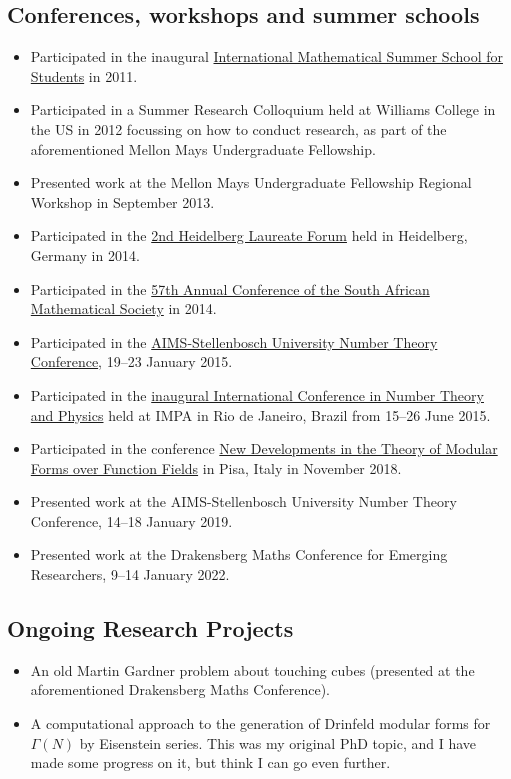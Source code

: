 \documentclass{article}
\begin{document}
\subsection{Conferences, workshops and summer schools}
\begin{itemize}
	\item Participated in the inaugural \href{http://math.jacobs-university.de/summerschool/2011}{International Mathematical Summer School for Students} in 2011.
	\item Participated in a Summer Research Colloquium held at Williams College in the US in 2012 focussing on how to conduct research, as part of the aforementioned Mellon Mays Undergraduate Fellowship.
	\item Presented work at the Mellon Mays Undergraduate Fellowship Regional Workshop in September 2013.
	\item Participated in the \href{http://www.heidelberg-laureate-forum.org/event_2014/}{2nd Heidelberg Laureate Forum} held in Heidelberg, Germany in 2014.
	\item Participated in the \href{http://www.unisa.ac.za/Default.asp?Cmd=ViewContent&ContentID=96795}{57th Annual Conference of the South African Mathematical Society} in 2014.
	\item Participated in the \href{http://www.aims.ac.za/en/research-centre/workshops-conferences/past/aims-stellenbosch-university-number-theory-conference-19-23-january-2015}{AIMS-Stellenbosch University Number Theory Conference}, 19--23 January 2015.
	\item Participated in the \href{http://www.impa.br/opencms/pt/eventos/store/evento_1504}{inaugural International Conference in Number Theory and Physics} held at IMPA in Rio de Janeiro, Brazil from 15--26 June 2015.
	\item Participated in the conference \href{https://dmvpisa2018.wordpress.com/}{New Developments in the Theory of Modular Forms over Function Fields} in Pisa, Italy in November 2018.
	\item Presented work at the AIMS-Stellenbosch University Number Theory Conference, 14--18 January 2019.
	\item Presented work at the Drakensberg Maths Conference for Emerging Researchers, 9--14 January 2022.
\end{itemize}

\subsection{Ongoing Research Projects}
\begin{itemize}
	\item An old Martin Gardner problem about touching cubes (presented at the aforementioned Drakensberg Maths Conference).
	\item A computational approach to the generation of Drinfeld modular forms for $\Gamma(N)$ by Eisenstein series. This was my original PhD topic, and I have made some progress on it, but think I can go even further.
\end{itemize}
\end{document}
